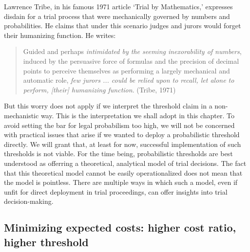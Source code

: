 \documentclass[
  10pt,
  dvipsnames,enabledeprecatedfontcommands]{scrartcl}
\begin{document}
Lawrence Tribe, in his famous 1971 article `Trial by Mathematics,'
expresses disdain for a trial process that were mechanically governed by
numbers and probabilities. He claims that under this scenario judges and
jurors would forget their humanizing function. He writes:

\begin{quote}
Guided and perhaps
\textit{intimidated by the seeming inexorability of numbers}, induced by
the persuasive force of formulas and the precision of decimal points to
perceive themselves as performing a largely mechanical and automatic
role, \textit{few jurors ... 
could be relied upon to recall, let alone to 
perform, [their] humanizing function}. \hspace*{\fill} (Tribe, 1971)
\end{quote}

\noindent But this worry does not apply if we interpret the threshold
claim in a non-mechanistic way. This is the interpretation we shall
adopt in this chapter. To avoid setting the bar for legal probabilism
too high, we will not be concerned with practical issues that arise if
we wanted to deploy a probabilistic threshold directly. We will grant
that, at least for now, successful implementation of such thresholds is
not viable. For the time being, probabilistic thresholds are best
understood as offerring a theoretical, analytical model of trial
decisions. The fact that this theoretical model cannot be easily
operationalized does not mean that the model is pointless. There are
multiple ways in which such a model, even if unfit for direct deployment
in trial proceedings, can offer insights into trial decision-making.

\hypertarget{minimizing-expected-costs-higher-cost-ratio-higher-threshold}{%
\subsection{Minimizing expected costs: higher cost ratio, higher
threshold}\label{minimizing-expected-costs-higher-cost-ratio-higher-threshold}}
\end{document}

